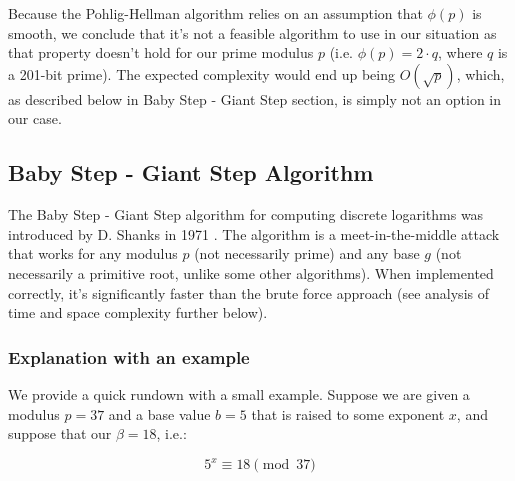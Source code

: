 \documentclass{article}
\begin{document}
      Because the Pohlig-Hellman algorithm relies on an assumption that $\phi(p)$ is smooth, we conclude that it's not a feasible algorithm to use in our situation as that property doesn't hold for our prime modulus $p$ (i.e. $\phi(p) = 2 \cdot q$, where $q$ is a 201-bit prime). The expected complexity would end up being $O(\sqrt{p})$, which, as described below in Baby Step - Giant Step section, is simply not an option in our case.

      \subsection{Baby Step - Giant Step Algorithm}

      The Baby Step - Giant Step algorithm for computing discrete logarithms was introduced by D. Shanks in 1971 \autocite{Shanks1971}. The algorithm is a meet-in-the-middle attack that works for any modulus $p$ (not necessarily prime) and any base $g$ (not necessarily a primitive root, unlike some other algorithms). When implemented correctly, it's significantly faster than the brute force approach (see analysis of time and space complexity further below).

      \subsubsection{Explanation with an example}

      We provide a quick rundown with a small example. Suppose we are given a modulus $p = 37$ and a base value $b = 5$ that is raised to some exponent $x$, and suppose that our $\beta = 18$, i.e.:

      $$5^x \equiv 18 \pmod{37}$$
\end{document}

